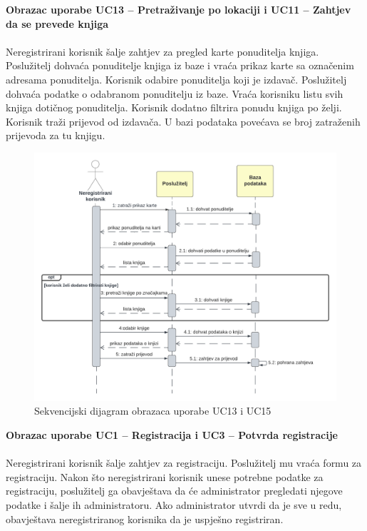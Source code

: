 				\textbf{Obrazac uporabe UC13 – Pretraživanje po lokaciji i UC11 – Zahtjev da se prevede knjiga}\\\\
				Neregistrirani korisnik šalje zahtjev za pregled karte ponuditelja knjiga. Poslužitelj dohvaća ponuditelje knjiga iz baze i vraća prikaz karte sa označenim adresama ponuditelja. Korisnik odabire ponuditelja koji je izdavač. Poslužitelj dohvaća podatke o odabranom ponuditelju iz baze. Vraća korisniku listu svih knjiga dotičnog ponuditelja. Korisnik dodatno filtrira ponudu knjiga po želji. Korisnik traži prijevod od izdavača. U bazi podataka povećava se broj zatraženih prijevoda za tu knjigu.\\
				
				\begin{figure}[h]
					\centering
					\includegraphics[width = \textwidth]{slike/sekvUC15UC13.PNG}
					\caption{Sekvencijski dijagram obrazaca uporabe UC13 i UC15}
					\label{fig:enter-label}
				\end{figure}
				\eject
				
				\textbf{Obrazac uporabe UC1 – Registracija i UC3 – Potvrda registracije}\\\\
				Neregistrirani korisnik šalje zahtjev za registraciju. Poslužitelj mu vraća formu za registraciju. Nakon što neregistrirani korisnik unese potrebne podatke za registraciju, poslužitelj ga obavještava da će administrator pregledati njegove podatke i šalje ih administratoru. Ako administrator utvrdi da je sve u redu, obavještava neregistriranog korisnika da je uspješno registriran.\\
				
